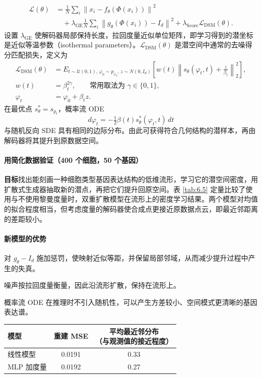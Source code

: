 \[
  \begin{aligned}
  \mathcal L(\theta)
    &=\frac1N\sum_i\left\|x_i-f_\theta(\Phi(x_i))\right\|^2\\
    &\quad+\lambda_{\mathrm{GE}}\frac1N\sum_i
         \left\|g_\theta(\Phi(x_i))-I_d\right\|^2
        +\lambda_{\mathrm{Score}}\mathcal L_{\mathrm{DSM}}(\theta).
  \end{aligned}
\]
设置 $\lambda_{\mathrm{GE}}$ 使解码器局部保持长度，拉回度量近似单位矩阵，即学习得到的潜坐标是近似等温参数（isothermal parameters）。$\mathcal L_{\mathrm{DSM}}(\theta)$ 是潜空间中通常的去噪得分匹配损失，定义为
\[
  \begin{aligned}
    \mathcal L_{\mathrm{DSM}}(\theta)
     &= E_{t\sim\mathcal U(0,1),\,\varphi_0\sim p_{\varphi_0},\,z\sim N(0,I_d)}
          \left[w(t)\left\|s_\theta(\varphi_t,t)+\frac{z}{\beta_t}\right\|_2^2\right],\\
    w(t)&=\beta_t^{2\gamma},\qquad\text{常用取法为 }\gamma\in\{0,1\},\\
    \varphi_t&=\varphi_0+\beta_t z.
  \end{aligned}
\]
在最优点 $s_\theta^*=s_{p_t}$，概率流 ODE
\[
  d\varphi_t=-\tfrac12\beta(t)s_\theta^*(\varphi_t,t)\,dt
\]
与随机反向 SDE 具有相同的边际分布。由此可获得符合几何结构的潜样本，再由解码器将其提升到原数据空间。

\paragraph{用简化数据验证（400 个细胞，50 个基因）}

\textbf{目标}\quad 找出能刻画一种细胞类型基因表达结构的低维流形，学习它的潜空间密度，用扩散式生成器抽取新的潜点，再把它们提升回原空间。表 \ref{tab:6.5} 定量比较了使用与不使用黎曼度量时，双重扩散模型在流形上的密度学习结果。两个模型对均值的拟合程度相当，但考虑度量的解码器使合成点更接近原数据点云，即最近邻距离的差距较小。

\paragraph{新模型的优势}

\begin{description}[leftmargin=2em]
  \item[考虑几何结构的解码器] 对 $g_\theta-I_d$ 施加惩罚，使映射近似等距，并保留局部邻域，从而减少提升过程中产生的失真。
  \item[各向同性的潜空间噪声] 噪声按拉回度量衡量，因此沿流形扩散，保持在流形上。
  \item[确定性 ODE 采样] 概率流 ODE 在推理时不引入随机性，可以产生方差较小、空间模式更清晰的基因表达谱。
\end{description}

\begin{table}[htbp]
  \centering\small
  \begin{tabular}{lcc}
    \toprule
    模型 & 重建 MSE & \shortstack{平均最近邻分布\\（与观测值的接近程度）}\\
    \midrule
    线性模型 & 0.0191 & 0.33\\
    MLP 加度量 & 0.0192 & 0.27\\
    \bottomrule
  \end{tabular}
\end{table}
